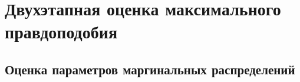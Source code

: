 \documentclass[aspectratio=169]{beamer}
\begin{document}



\section{Двухэтапная оценка максимального правдоподобия}
\subsection{Оценка параметров маргинальных распределений}
\end{document}
